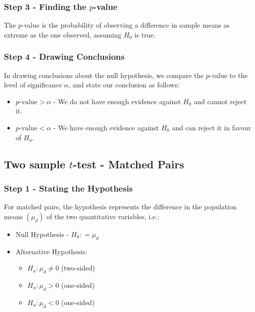 \documentclass[12pt letter]{report}
\begin{document}
\subsubsection{Step 3 - Finding the $p$-value}

The $p$-value is the probability of observing a difference in sample means as extreme as the one observed, assuming $H_0$
is true.

\subsubsection{Step 4 - Drawing Conclusions}

In drawing conclusions about the null hypothesis, we compare the $p$-value to the level of significance $\alpha $, and
state our conclusion as follows:
\begin{itemize}
  \item $p\text{-value} > \alpha$ - We do not have enough evidence against $H_0$ and cannot reject it.
  \item $p\text{-value} < \alpha$ - We have enough evidence against $H_0$ and can reject it in favour of $H_a$.
\end{itemize}

\subsection{Two sample $t$-test - Matched Pairs}

\subsubsection{Step 1 - Stating the Hypothesis}

For matched pairs, the hypothesis represents the difference in the population means $\left( \mu_d \right) $ of the two
quantitative variables, i.e.:
\begin{itemize}
  \item Null Hypothesis - $H_0: = \mu_{d}$
  \item Alternative Hypothesis:
        \begin{itemize}
          \item $H_a: \mu_d \neq 0$ (two-sided)
          \item $H_a: \mu_d > 0$ (one-sided)
          \item $H_a: \mu_d < 0$ (one-sided)
        \end{itemize}
\end{itemize}
\end{document}

